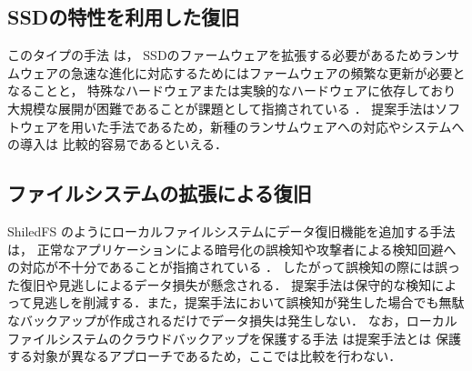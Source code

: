 \subsection{SSDの特性を利用した復旧}
このタイプの手法 \cite{huang2017flashguard,baek2018ssd} は，
SSDのファームウェアを拡張する必要があるためランサムウェアの急速な進化に対応するためにはファームウェアの頻繁な更新が必要となることと，
特殊なハードウェアまたは実験的なハードウェアに依存しており大規模な展開が困難であることが課題として指摘されている \cite{wang2024ransom}．
提案手法はソフトウェアを用いた手法であるため，新種のランサムウェアへの対応やシステムへの導入は
比較的容易であるといえる．

\subsection{ファイルシステムの拡張による復旧}
ShiledFS \cite{shieldFS} のようにローカルファイルシステムにデータ復旧機能を追加する手法は，
正常なアプリケーションによる暗号化の誤検知や攻撃者による検知回避への対応が不十分であることが指摘されている \cite{han2020effectiveness,css2024-enomoto}．
したがって誤検知の際には誤った復旧や見逃しによるデータ損失が懸念される．
提案手法は保守的な検知によって見逃しを削減する．また，提案手法において誤検知が発生した場合でも無駄なバックアップが作成されるだけでデータ損失は発生しない．
なお，ローカルファイルシステムのクラウドバックアップを保護する手法 \cite{matos2018rockfs} は提案手法とは
保護する対象が異なるアプローチであるため，ここでは比較を行わない．
